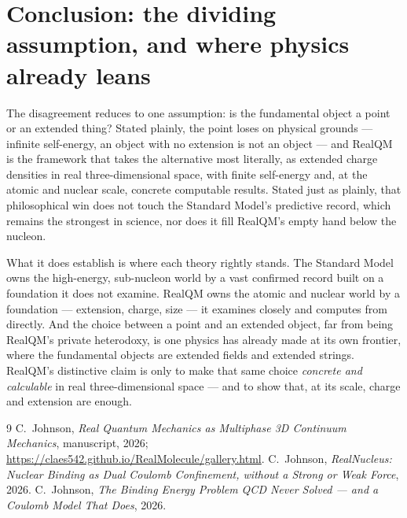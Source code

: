 \documentclass[11pt]{article}
\begin{document}
\section{Conclusion: the dividing assumption, and where physics already leans}
\label{sec:concl}

The disagreement reduces to one assumption: is the fundamental object a point or an extended thing? Stated
plainly, the point loses on physical grounds --- infinite self-energy, an object with no extension is not an
object --- and RealQM is the framework that takes the alternative most literally, as extended charge
densities in real three-dimensional space, with finite self-energy and, at the atomic and nuclear scale,
concrete computable results. Stated just as plainly, that philosophical win does not touch the Standard
Model's predictive record, which remains the strongest in science, nor does it fill RealQM's empty hand
below the nucleon.

What it does establish is where each theory rightly stands. The Standard Model owns the high-energy,
sub-nucleon world by a vast confirmed record built on a foundation it does not examine. RealQM owns the
atomic and nuclear world by a foundation --- extension, charge, size --- it examines closely and computes
from directly. And the choice between a point and an extended object, far from being RealQM's private
heterodoxy, is one physics has already made at its own frontier, where the fundamental objects are
extended fields and extended strings. RealQM's distinctive claim is only to make that same choice
\emph{concrete and calculable} in real three-dimensional space --- and to show that, at its scale, charge
and extension are enough.

\begin{thebibliography}{9}
 C.~Johnson, \emph{Real Quantum Mechanics as Multiphase 3D Continuum Mechanics},
manuscript, 2026; \url{https://claes542.github.io/RealMolecule/gallery.html}.
 C.~Johnson, \emph{RealNucleus: Nuclear Binding as Dual Coulomb Confinement, without
a Strong or Weak Force}, 2026.
 C.~Johnson, \emph{The Binding Energy Problem QCD Never Solved --- and a Coulomb Model
That Does}, 2026.
\end{thebibliography}
\end{document}
